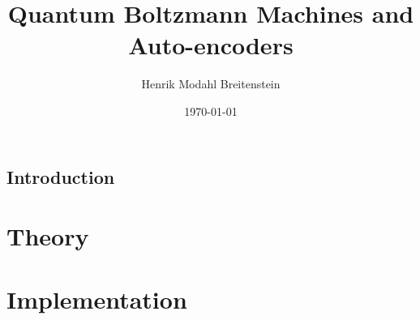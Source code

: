 \documentclass[a4paper]{report}
\begin{document}
\title{Quantum Boltzmann Machines and Auto-encoders}
\author{Henrik Modahl Breitenstein}
\date{\today}
\maketitle



\tableofcontents


\chapter{Introduction}


\part{Theory}


\part{Implementation}


%

%


\end{document}
